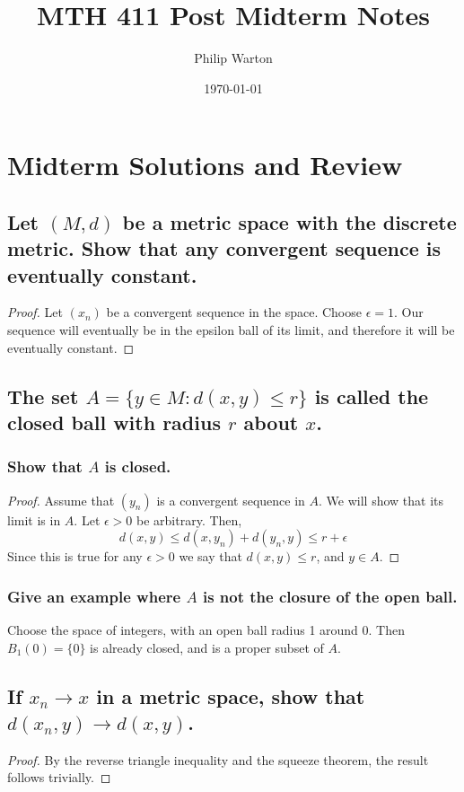 \documentclass{article}
\theoremstyle{definition}
\begin{document}
\title{MTH 411 Post Midterm Notes}
\author{Philip Warton}
\date{\today}
\maketitle
\section{Midterm Solutions and Review}
    \subsection{Let $(M,d)$ be a metric space with the discrete metric. Show that any convergent sequence is eventually constant.}
        \begin{proof}
            Let $(x_n)$ be a convergent sequence in the space.
            Choose $\epsilon = 1$.
            Our sequence will eventually be in the epsilon ball of its limit, and therefore it will be eventually constant.
        \end{proof}
    \subsection{The set $A = \{y \in M : d(x,y) \leqslant r \}$ is called the closed ball with radius $r$ about $x$.}
        \subsubsection{Show that $A$ is closed.}
            \begin{proof}
                Assume that $(y_n)$ is a convergent sequence in $A$.
                We will show that its limit is in $A$.
                Let $\epsilon > 0$ be arbitrary.
                Then,
                \[
                    d(x,y) \leqslant d(x, y_n) + d(y_n, y) \leqslant r + \epsilon
                \]
                Since this is true for any $\epsilon > 0$ we say that $d(x,y) \leqslant r$, and $y \in A$.
            \end{proof}
        \subsubsection{Give an example where $A$ is not the closure of the open ball.}
            Choose the space of integers, with an open ball radius 1 around 0.
            Then $B_1(0) = \{0\}$ is already closed, and is a proper subset of $A$.
    \subsection{If $x_n \rightarrow x$ in a metric space, show that $d(x_n,y) \rightarrow d(x,y)$.}
        \begin{proof}
            By the reverse triangle inequality and the squeeze theorem, the result follows trivially.
        \end{proof}
\end{document}
